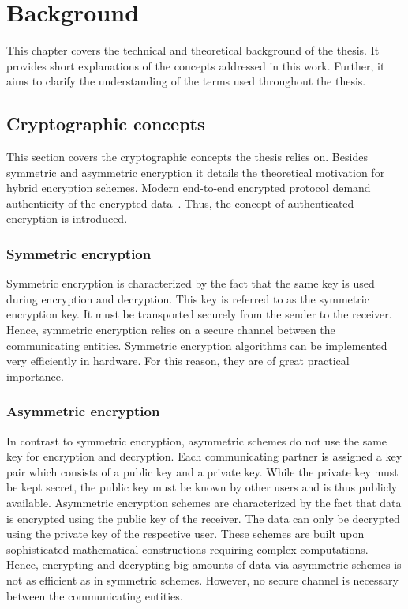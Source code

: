 \documentclass[../main.tex]{subfiles}
\begin{document}
\chapter{Background}
This chapter covers the technical and theoretical background of the thesis.
It provides short explanations of the concepts addressed in this work.
Further, it aims to clarify the understanding of the terms used throughout the thesis.


\section{Cryptographic concepts}
This section covers the cryptographic concepts the thesis relies on.
Besides symmetric and asymmetric encryption it details the theoretical motivation for hybrid encryption schemes.
Modern end-to-end encrypted protocol demand authenticity of the encrypted data~\cite{Mallory2022}.
Thus, the concept of authenticated encryption is introduced.

\subsection{Symmetric encryption}
Symmetric encryption is characterized by the fact that the same key is used during encryption and decryption.
This key is referred to as the symmetric encryption key.
It must be transported securely from the sender to the receiver.
Hence, symmetric encryption relies on a secure channel between the communicating entities.
Symmetric encryption algorithms can be implemented very efficiently in hardware.
For this reason, they are of great practical importance.~\cite[300]{Eckert2018}

\subsection{Asymmetric encryption}
In contrast to symmetric encryption, asymmetric schemes do not use the same key for encryption and decryption.
Each communicating partner is assigned a key pair which consists of a public key and a private key.
While the private key must be kept secret, the public key must be known by other users and is thus publicly available.
Asymmetric encryption schemes are characterized by the fact that data is encrypted using the public key of the receiver.
The data can only be decrypted using the private key of the respective user.
These schemes are built upon sophisticated mathematical constructions requiring complex computations.
Hence, encrypting and decrypting big amounts of data via asymmetric schemes is not as efficient as in symmetric schemes.
However, no secure channel is necessary between the communicating entities.~\cite[331]{Eckert2018}
\end{document}
